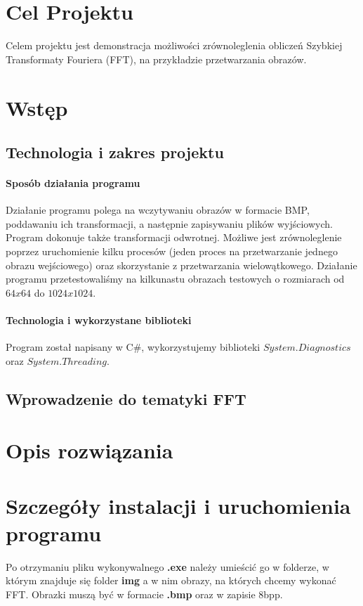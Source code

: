 \section{Cel Projektu}
Celem projektu jest demonstracja możliwości zrównoleglenia obliczeń Szybkiej Transformaty Fouriera (FFT), na przykładzie przetwarzania obrazów.
\section{Wstęp}
\subsection{Technologia i zakres projektu}
\paragraph{Sposób działania programu}
Działanie programu polega na wczytywaniu obrazów w formacie BMP, poddawaniu ich
transformacji, a następnie zapisywaniu plików wyjściowych. Program dokonuje także transformacji odwrotnej. Możliwe jest zrównoleglenie poprzez uruchomienie kilku procesów (jeden proces na przetwarzanie jednego obrazu wejściowego) oraz skorzystanie z przetwarzania wielowątkowego. Działanie programu przetestowaliśmy na kilkunastu obrazach testowych o rozmiarach od $ 64x64 $ do $ 1024x1024 $.
\paragraph{Technologia i wykorzystane biblioteki}Program został napisany w C\#, wykorzystujemy biblioteki $ System.Diagnostics $ oraz $ System.Threading $.
\subsection{Wprowadzenie do tematyki FFT}
\section{Opis rozwiązania}
\section{Szczegóły instalacji i uruchomienia programu}
Po otrzymaniu pliku wykonywalnego \textbf{.exe} należy umieścić go w folderze, w którym znajduje się folder \textbf{img} a w nim obrazy, na których chcemy wykonać FFT. Obrazki muszą być w formacie \textbf{.bmp} oraz w zapisie 8bpp. 

